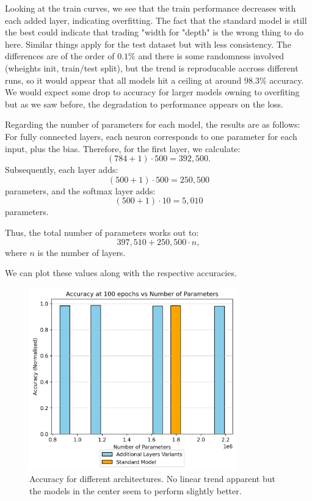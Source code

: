 \documentclass{article}
\begin{document}
Looking at the train curves, we see that the train performance decreases with each added layer, indicating overfitting.
The fact that the standard model is still the best could indicate that trading "width for "depth" is the wrong thing to do here.
Similar things apply for the test dataset but with less consistency.
The differences are of the order of \(0.1\% \) and there is some randomness involved (wheights init, train/test split), but the trend is reproducable accross different runs, so it would appear that all models hit a ceiling at around \(98.3\%\) accuracy.
We would expect some drop to accuracy for larger models owning to overfiting but as we saw before, the degradation to performance appears on the loss.

Regarding the number of parameters for each model, the results are as follows:
For fully connected layers, each neuron corresponds to one parameter for each input, plus the bias. Therefore, for the first layer, we calculate:
\[
(784+1) \cdot 500 = 392,500.
\]
Subsequently, each layer adds:
\[
(500+1) \cdot 500 = 250,500
\]
parameters, and the softmax layer adds:
\[
(500+1) \cdot 10 = 5,010
\]
parameters. 

Thus, the total number of parameters works out to:
\[
397,510 + 250,500 \cdot n,
\]
where \(n\) is the number of layers.

We can plot these values along with the respective accuracies.

\begin{figure}[h!]
    \centering
    \includegraphics[width=0.8\textwidth]{./plots/plot11.png}  %
    \caption{Accuracy for different architectures. No linear trend apparent but the models in the center seem to perform slightly better.}
    \label{fig:plot11}  %
\end{figure}
\end{document}
